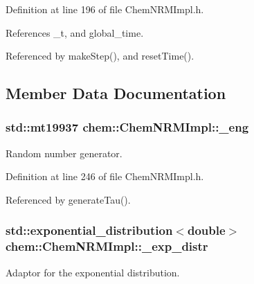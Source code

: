 Definition at line 196 of file Chem\-N\-R\-M\-Impl.\-h.



References \-\_\-t, and global\-\_\-time.



Referenced by make\-Step(), and reset\-Time().



\subsection{Member Data Documentation}
\hypertarget{classchem_1_1ChemNRMImpl_ad0dce1073a3c37dd21c6523a81dd18e6}{
\subsubsection[{\-\_\-eng}]{\setlength{\rightskip}{0pt plus 5cm}std\-::mt19937 {\bf chem\-::\-Chem\-N\-R\-M\-Impl\-::\-\_\-eng}}}\label{classchem_1_1ChemNRMImpl_ad0dce1073a3c37dd21c6523a81dd18e6}


Random number generator. 



Definition at line 246 of file Chem\-N\-R\-M\-Impl.\-h.



Referenced by generate\-Tau().

\hypertarget{classchem_1_1ChemNRMImpl_ac817f5c731ea5522ea661a9e6c978d6a}{
\subsubsection[{\-\_\-exp\-\_\-distr}]{\setlength{\rightskip}{0pt plus 5cm}std\-::exponential\-\_\-distribution$<$double$>$ {\bf chem\-::\-Chem\-N\-R\-M\-Impl\-::\-\_\-exp\-\_\-distr}}}\label{classchem_1_1ChemNRMImpl_ac817f5c731ea5522ea661a9e6c978d6a}


Adaptor for the exponential distribution. 



